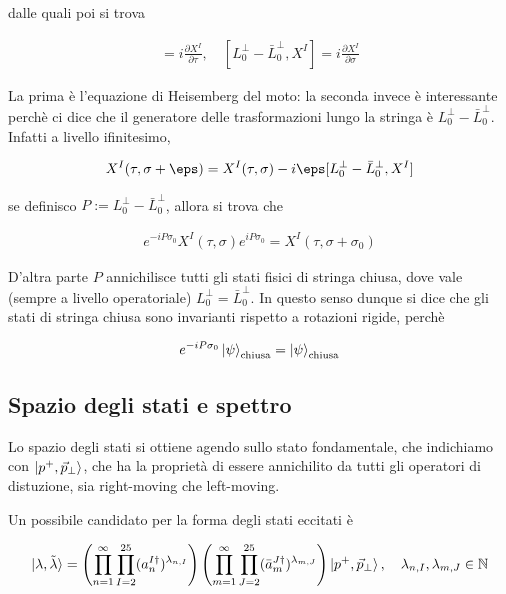 \documentclass{report}
\begin{document}
dalle quali poi si trova 

\begin{align}
    [L_0^\perp + \bar{L}_0^\perp, X^I] = i \frac{\partial X^I}{\partial \tau}, \quad [L_0^\perp - \bar{L}_0^\perp, X^I] = i\frac{\partial X^I}{\partial \sigma}
\end{align}

La prima è l'equazione di Heisemberg del moto: la seconda invece è interessante perchè ci dice che il generatore delle trasformazioni lungo la stringa è \(L_0^\perp - \bar{L}_0^\perp\). Infatti a livello ifinitesimo, 

\begin{align}
    X^I(\tau, \sigma + \eps) = X^I(\tau, \sigma) -i\eps [L_0^\perp - \bar{L}_0^\perp, X^I]
\end{align}

se definisco \(P:= L_0^\perp - \bar{L}_0^\perp\), allora si trova che 

\begin{align}
    e^{-iP\sigma_0}X^I(\tau, \sigma)e^{iP\sigma_0} = X^I(\tau, \sigma + \sigma_0)
\end{align}

D'altra parte \(P\) annichilisce tutti gli stati fisici di stringa chiusa, dove vale (sempre a livello operatoriale) \(L_0^\perp = \bar{L}_0^\perp\). In questo senso dunque si dice che gli stati di stringa chiusa sono invarianti rispetto a rotazioni rigide, perchè 

\begin{align}
    e^{-iP\sigma_0}\ket{\psi}_{\text{chiusa}} = \ket{\psi}_{\text{chiusa}}
\end{align}

\subsection{Spazio degli stati e spettro}

Lo spazio degli stati si ottiene agendo sullo stato fondamentale, che indichiamo con \(\ket{p^+, \vec{p}_\perp}\), che ha la proprietà di essere annichilito da tutti gli operatori di distuzione, sia right-moving che left-moving. 

Un possibile candidato per la forma degli stati eccitati è 

\begin{align}
    \ket{\lambda, \tilde{\lambda}} = \left(\prod_{n=1}^\infty \prod_{I=2}^{25}(a_n^{I\dagger})^{\lambda_{n,I}} \right)\left(\prod_{m=1}^\infty \prod_{J=2}^{25}(\bar{a}_m^{J\dagger})^{\lambda_{m,J}} \right)\ket{p^+, \vec{p}_\perp}, \quad \lambda_{n, I}, \lambda_{m, J} \in \mathbb{N}
\end{align}
\end{document}
